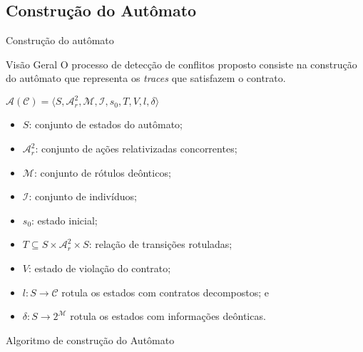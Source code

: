 \subsection{Construção do Autômato}    
    \begin{frame}{Construção do autômato}
        \begin{block}{Visão Geral}
            O processo de detecção de conflitos proposto consiste na construção do autômato que representa os \textit{traces} que satisfazem o contrato.
        \end{block}
        \centering$\mathcal{A}(\mathcal{C})= \langle S, \mathcal{A}^2_r, \mathcal{M}, \mathcal{I}, s_0, T, V, l, \delta \rangle$
        
        \begin{itemize}
            \item $S$: conjunto de estados do autômato;
            \item $\mathcal{A}^2_r$: conjunto de ações relativizadas concorrentes;
            \item $\mathcal{M}$: conjunto de rótulos deônticos;
            \item $\mathcal{I}$: conjunto de indivíduos;
            \item $s_0$: estado inicial;
            \item $T \subseteq S \times \mathcal{A}^2_r \times S$: relação de transições rotuladas;
            \item $V$: estado de violação do contrato;
            \item $l : S \to \mathcal{C}$ rotula os estados com contratos decompostos; e
            \item  $\delta: S \to 2^{\mathcal{M}}$ rotula os estados com informações deônticas.
        \end{itemize}
    \end{frame}
    
    \begin{frame}{Algoritmo de construção do Autômato}
        \centering{}
\end{frame}

